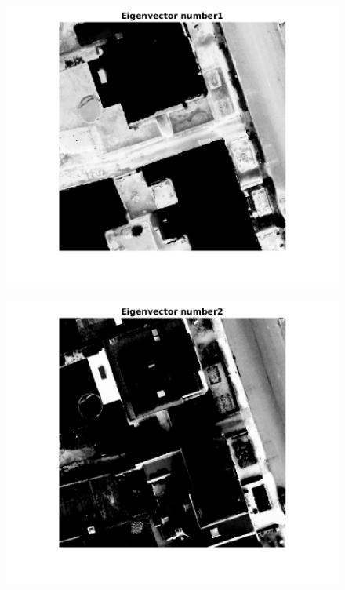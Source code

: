 \begin{figure}
\includegraphics[width=\linewidth]{evec1.png}
\end{figure}

\begin{figure}
\includegraphics[width=\linewidth]{evec2.png}
\end{figure}

